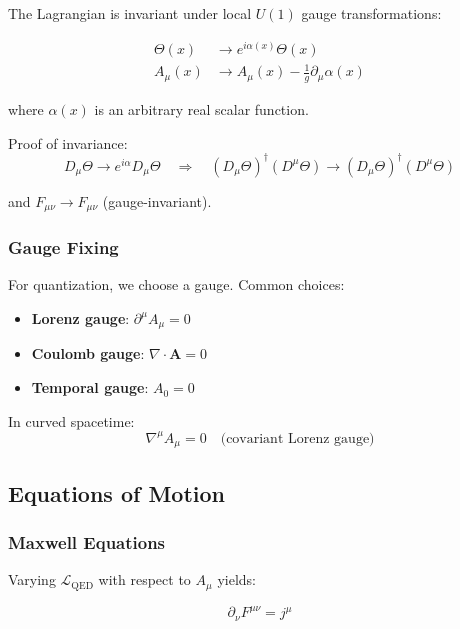 The Lagrangian is invariant under local $U(1)$ gauge transformations:

\begin{align}
\Theta(x) &\to e^{i\alpha(x)} \Theta(x) \label{eq:canonical:qed_gauge_theta} \\
A_\mu(x) &\to A_\mu(x) - \frac{1}{g}\partial_\mu\alpha(x) \label{eq:canonical:qed_gauge_photon}
\end{align}

where $\alpha(x)$ is an arbitrary real scalar function.

Proof of invariance:
\begin{equation}
D_\mu\Theta \to e^{i\alpha} D_\mu\Theta \quad \Rightarrow \quad (D_\mu\Theta)^\dagger(D^\mu\Theta) \to (D_\mu\Theta)^\dagger(D^\mu\Theta)
\end{equation}

and $F_{\mu\nu} \to F_{\mu\nu}$ (gauge-invariant).

\subsubsection{Gauge Fixing}

For quantization, we choose a gauge. Common choices:

\begin{itemize}
    \item \textbf{Lorenz gauge}: $\partial^\mu A_\mu = 0$
    \item \textbf{Coulomb gauge}: $\nabla \cdot \mathbf{A} = 0$
    \item \textbf{Temporal gauge}: $A_0 = 0$
\end{itemize}

In curved spacetime:
\begin{equation}
\nabla^\mu A_\mu = 0 \quad \text{(covariant Lorenz gauge)}
\end{equation}

\subsection{Equations of Motion}

\subsubsection{Maxwell Equations}

Varying $\mathcal{L}_{\text{QED}}$ with respect to $A_\mu$ yields:

\begin{equation}
\label{eq:canonical:maxwell}
\partial_\nu F^{\mu\nu} = j^\mu
\end{equation}

